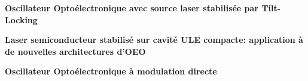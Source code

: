 \documentclass[9pt,a4paper,academicons]{altacv}
\begin{document}
\begin{fullwidth}
\vspace{-1em}\textbf{Oscillateur Optoélectronique avec source laser stabilisée par Tilt-Locking}

\divider
    
\vspace{-1em}\textbf{Laser semiconducteur stabilisé sur
	cavité ULE compacte: application à
	de nouvelles architectures d’OEO}

\divider

    
\vspace{-1em}\textbf{Oscillateur Optoélectronique à modulation directe}


    
    
\end{fullwidth}
\end{document}
